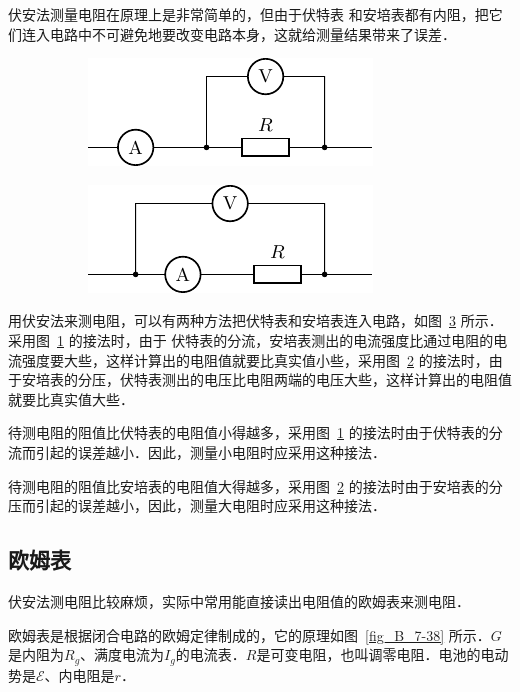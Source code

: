 伏安法测量电阻在原理上是非常简单的，但由于伏特表
和安培表都有内阻，把它们连入电路中不可避免地要改变电路本身，这就给测量结果带来了误差．
\begin{figure}[htbp]
    \centering
    \begin{subfigure}{0.4\linewidth}
        \centering
        \includegraphics{fig/B/7-37a.pdf}
        \caption{}\label{fig_B_7-37a}
    \end{subfigure}
    \hfil
    \begin{subfigure}{0.4\linewidth}
        \centering
        \includegraphics{fig/B/7-37b.pdf}
        \caption{}\label{fig_B_7-37b}
    \end{subfigure}
    \caption{}\label{fig_B_7-37}
\end{figure}

用伏安法来测电阻，可以有两种方法把伏特表和安培表连入电路，如图~\ref{fig_B_7-37} 所示．采用图~\ref{fig_B_7-37a} 的接法时，由于
伏特表的分流，安培表测出的电流强度比通过电阻的电流强度要大些，这样计算出的电阻值就要比真实值小些，采用图~\ref{fig_B_7-37b} 的接法时，由于安培表的分压，伏特表测出的电压比电阻两端的电压大些，这样计算出的电阻值就要比真实值大些．

待测电阻的阻值比伏特表的电阻值小得越多，采用图~\ref{fig_B_7-37a} 的接法时由于伏特表的分流而引起的误差越小．因此，测量小电阻时应采用这种接法．

待测电阻的阻值比安培表的电阻值大得越多，采用图~\ref{fig_B_7-37b} 的接法时由于安培表的分压而引起的误差越小，因此，测量大电阻时应采用这种接法．

\subsection{欧姆表}


伏安法测电阻比较麻烦，实际中常用能直接读出电阻值的欧姆表来测电阻．

欧姆表是根据闭合电路的欧姆定律制成的，它的原理如图~\ref{fig_B_7-38} 所示．$G$是内阻为$R_g$、满度电流为$I_g$的电流表．$R$是可变电阻，也叫调零电阻．电池的电动势是$\mathcal{E}$、内电阻是$r$．

